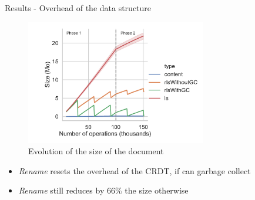 \documentclass[10pt]{beamer}
\begin{document}
\begin{frame}{Results - Overhead of the data structure}
  \begin{figure}
    \centering
    \includegraphics[width=0.7\textwidth]{img/snapshots-sizes.pdf}
    \caption{Evolution of the size of the document}
    \label{fig:evolution-document-size}
  \end{figure}

  \vspace{-1\baselineskip}
  \begin{itemize}
    \pause
    \item \emph{Rename} resets the overhead of the CRDT, if can garbage collect
    \pause
    \item \emph{Rename} still reduces by $66\%$ the size otherwise
  \end{itemize}
\end{frame}
\end{document}
